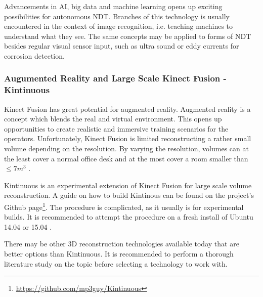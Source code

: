 Advancements in \ac{AI}, big data and machine learning opens up exciting possibilities for autonomous \ac{NDT}. Branches of this technology is usually encountered in the context of image recognition, i.e. teaching machines to understand what they see. The same concepts may be applied to forms of \ac{NDT} besides regular visual sensor input, such as ultra sound or eddy currents for corrosion detection.  

\subsubsection{Augumented Reality and Large Scale Kinect Fusion - Kintinuous}

Kinect Fusion has great potential for augmented reality. Augmented reality is a concept which blends the real and virtual environment. This opens up opportunities to create realistic and immersive training scenarios for the operators. Unfortunately, Kinect Fusion is limited reconstructing a rather small volume depending on the resolution. By varying the resolution, volumes can at the least cover a normal office desk and at the most cover a room smaller than $\leq 7 m^3$ \cite{newcombe2011kinectfusion}.  

Kintinuous is an experimental extension of Kinect Fusion for large scale volume reconstruction. A guide on how to build Kintinous can be found  on the project's Github page\footnote{\url{https://github.com/mp3guy/Kintinuous}}. The procedure is complicated, as it usually is for experimental builds. It is recommended to attempt the procedure on a fresh install of Ubuntu 14.04 or 15.04 \cite{Kintinous}.

There may be other 3D reconstruction technologies available today that are better options than Kintinuous. It is recommended to perform a thorough literature study on the topic before selecting a technology to work with.